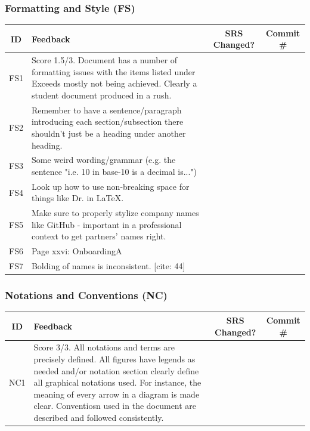 \documentclass{article}
\begin{document}
\subsubsection{Formatting and Style (FS)}
\begin{table}[h!]
\centering
\begin{tabular}{|c|p{8cm}|c|c|}
\hline
\textbf{ID} & \textbf{Feedback} & \textbf{SRS Changed?} & \textbf{Commit \#} \\ \hline
FS1 & Score 1.5/3. Document has a number of formatting issues with the items listed under Exceeds mostly not being achieved. Clearly a student document produced in a rush. & & \\ \hline
FS2 & Remember to have a sentence/paragraph introducing each section/subsection there shouldn't just be a heading under another heading. & & \\ \hline
FS3 & Some weird wording/grammar (e.g. the sentence "i.e. 10 in base-10 is a decimal is...") & & \\ \hline
FS4 & Look up how to use non-breaking space for things like Dr. in LaTeX. & & \\ \hline
FS5 & Make sure to properly stylize company names like GitHub - important in a professional context to get partners' names right. & & \\ \hline
FS6 & Page xxvi: OnboardingA & & \\ \hline
FS7 & Bolding of names is inconsistent. [cite: 44] & & \\ \hline
\end{tabular}
\end{table}

\subsubsection{Notations and Conventions (NC)}
\begin{table}[h!]
\centering
\begin{tabular}{|c|p{8cm}|c|c|}
\hline
\textbf{ID} & \textbf{Feedback} & \textbf{SRS Changed?} & \textbf{Commit \#} \\ \hline
NC1 & Score 3/3. All notations and terms are precisely defined. All figures have legends as needed and/or notation section clearly define all graphical notations used. For instance, the meaning of every arrow in a diagram is made clear. Conventiosn used in the document are described and followed consistently. & & \\ \hline
\end{tabular}
\end{table}
\end{document}
